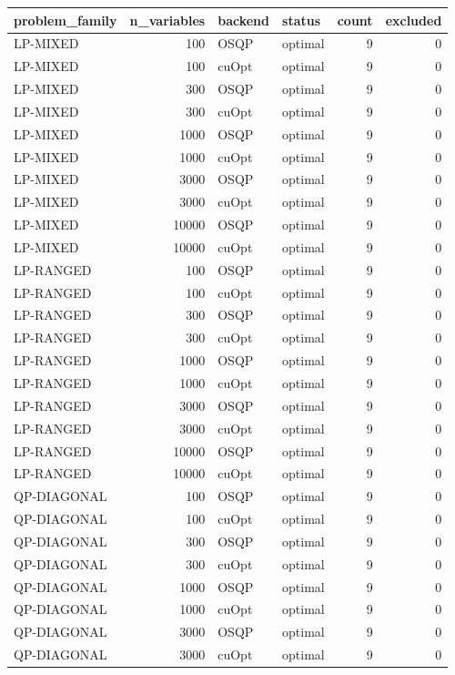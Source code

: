 \begin{table}
\label{tab:failure-timeout-inventory}
\begin{tabular}{lrllrr}
\toprule
problem\_family & n\_variables & backend & status & count & excluded \\
\midrule
LP-MIXED & 100 & OSQP & optimal & 9 & 0 \\
LP-MIXED & 100 & cuOpt & optimal & 9 & 0 \\
LP-MIXED & 300 & OSQP & optimal & 9 & 0 \\
LP-MIXED & 300 & cuOpt & optimal & 9 & 0 \\
LP-MIXED & 1000 & OSQP & optimal & 9 & 0 \\
LP-MIXED & 1000 & cuOpt & optimal & 9 & 0 \\
LP-MIXED & 3000 & OSQP & optimal & 9 & 0 \\
LP-MIXED & 3000 & cuOpt & optimal & 9 & 0 \\
LP-MIXED & 10000 & OSQP & optimal & 9 & 0 \\
LP-MIXED & 10000 & cuOpt & optimal & 9 & 0 \\
LP-RANGED & 100 & OSQP & optimal & 9 & 0 \\
LP-RANGED & 100 & cuOpt & optimal & 9 & 0 \\
LP-RANGED & 300 & OSQP & optimal & 9 & 0 \\
LP-RANGED & 300 & cuOpt & optimal & 9 & 0 \\
LP-RANGED & 1000 & OSQP & optimal & 9 & 0 \\
LP-RANGED & 1000 & cuOpt & optimal & 9 & 0 \\
LP-RANGED & 3000 & OSQP & optimal & 9 & 0 \\
LP-RANGED & 3000 & cuOpt & optimal & 9 & 0 \\
LP-RANGED & 10000 & OSQP & optimal & 9 & 0 \\
LP-RANGED & 10000 & cuOpt & optimal & 9 & 0 \\
QP-DIAGONAL & 100 & OSQP & optimal & 9 & 0 \\
QP-DIAGONAL & 100 & cuOpt & optimal & 9 & 0 \\
QP-DIAGONAL & 300 & OSQP & optimal & 9 & 0 \\
QP-DIAGONAL & 300 & cuOpt & optimal & 9 & 0 \\
QP-DIAGONAL & 1000 & OSQP & optimal & 9 & 0 \\
QP-DIAGONAL & 1000 & cuOpt & optimal & 9 & 0 \\
QP-DIAGONAL & 3000 & OSQP & optimal & 9 & 0 \\
QP-DIAGONAL & 3000 & cuOpt & optimal & 9 & 0 \\

\end{tabular}
\end{table}
